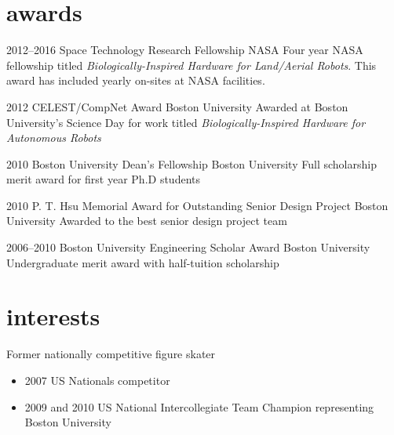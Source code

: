\documentclass[print]{friggeri-cv} %
\begin{document}
\clearpage
{}

\section{awards}

\begin{entrylist}


\entry
{2012--2016}
{Space Technology Research Fellowship}
{NASA}
{Four year NASA fellowship titled \emph{Biologically-Inspired Hardware for Land/Aerial Robots}. This award has included yearly on-sites at NASA facilities.}

\entry
{2012}
{CELEST/CompNet Award}
{Boston University}
{Awarded at Boston University's Science Day for work titled \emph{Biologically-Inspired Hardware for Autonomous Robots}}

\entry
{2010}
{Boston University Dean's Fellowship}
{Boston University}
{Full scholarship merit award for first year Ph.D students}

\entry
{2010}
{P. T. Hsu Memorial Award for Outstanding Senior Design Project}
{Boston University}
{Awarded to the best senior design project team}

\entry
{2006--2010}
{Boston University Engineering Scholar Award}
{Boston University}
{Undergraduate merit award with half-tuition scholarship}


\end{entrylist}



\section{interests}
Former nationally competitive figure skater
\begin{itemize}
\item 2007 US Nationals competitor
\item 2009 and 2010 US National Intercollegiate Team Champion representing Boston University
\end{itemize}
\end{document}
